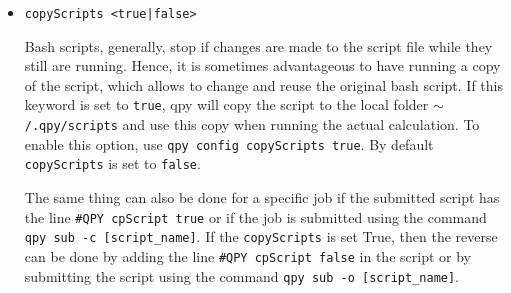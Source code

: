 \documentclass[a4paper,12pt]{article}
\begin{document}
\begin{itemize}
  It might seem a little complicated, but an example should clarify this.
  The default value is:\\
  \texttt{\%j (\%s):\%c (on \%n; wd: \%d)\textbackslash n}\\
  Let us suppose that one has only one job, running a command \texttt{bash my\_script.sh}, with ID 100, submitted from \texttt{/home/user/}, and it is currently running on the node \texttt{comp1}.

  \begin{lstlisting}[style=BashStyle]
+\$+ qpy check
100 (running):bash my_script.sh (on comp1; wd: /home/users/)
+\$+ qpy config checkFMT '%j: %s\n'
Check pattern modified to '%j: %s\n'
+\$+ qpy check
100: running
+\$+ qpy config checkFMT '%j (%s)\n\tSubmitted from %d\n\tStarted at %S\n-----\n'
Check pattern modified to '%j (%s)\n\tSubmitted from %d\n\tStarted at %S\n-----\n'
+\$+ qpy check
100 (running)
        Submitted from /home/users/
        Started at 2018-10-04 18:01:45.948201
-----
+\$+ qpy config checkFMT default
Check pattern restored to the default value: '%j (%s):%c (on %n; wd: %d)\n'.
+\$+ qpy check
100 (running):bash my_script.sh (on comp1; wd: /home/users/)
  \end{lstlisting}

  The \texttt{\textbackslash n} is important, and it means ``new line''.
  Without it, all jobs are printed in the same line.
  One can also use \texttt{\textbackslash t} to insert a tabulation, as the example shows.

\item \texttt{copyScripts <true|false>}

  Bash scripts, generally, stop if changes are made to the script file while they still are running.
  Hence, it is sometimes advantageous to have \qpy{} running a copy of the script, which allows to change and reuse the original bash script.
  If this keyword is set to \texttt{true}, qpy will copy the script to the local folder \texttt{$\sim$/.qpy/scripts} and use this copy when running the actual calculation.
  To enable this option, use \texttt{qpy config copyScripts true}. By default \texttt{copyScripts} is set to \texttt{false}. 
  
  The same thing can also be done for a specific job if the submitted script has the line \texttt{\#QPY cpScript true} or if the job is submitted using the command \texttt{qpy sub -c [script\_name]}.
  If the \texttt{copyScripts} is set True, then the reverse can be done by adding the line \texttt{\#QPY cpScript false} in the script or by submitting the script using the command \texttt{qpy sub -o [script\_name]}.
  
\end{itemize}
\end{document}

